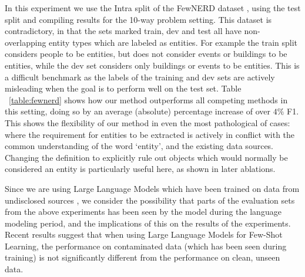 \documentclass[11pt]{article}
\begin{document}
In this experiment we use the Intra split of the FewNERD dataset \citep{ding2021few}, using the test split and compiling results for the 10-way problem setting. This dataset is contradictory, in that the sets  marked train, dev and test all have non-overlapping entity types which are labeled as entities. For example the train split considers people to be entities, but does not consider events or buildings to be entities, while the dev set considers only buildings or events to be entities. This is a difficult benchmark as the labels of the training and dev sets are actively misleading when the goal is to perform well on the test set. Table ~\ref{table:fewnerd} shows how our method outperforms all competing methods in this setting, doing so by an average (absolute) percentage increase of over $4\%$ F1. This shows the flexibility of our method in even the most pathological of cases: where the requirement for entities to be extracted is actively in conflict with the common understanding of the word `entity', and the existing data sources. Changing the definition to explicitly rule out objects which would normally be considered an entity is particularly useful here, as shown in later ablations. 


Since we are using Large Language Models which have been trained on data from undisclosed sources \citep{brown2020language, openai2023gpt4}, we consider the possibility that parts of the evaluation sets from the above experiments has been seen by the model during the language modeling period, and the implications of this on the results of the experiments. Recent results \citep{chowdhery2022palm} suggest that when using Large Language Models for Few-Shot Learning, the performance on contaminated data (which has been seen during training) is not significantly different from the performance on clean, unseen data. 
\end{document}
